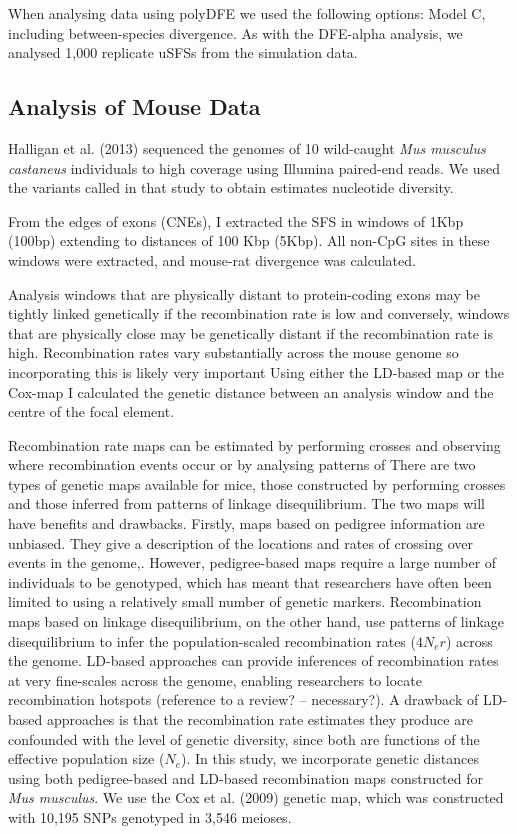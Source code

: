 \documentclass[11pt]{article}
\begin{document}
	 When analysing data using polyDFE we used the following options: Model C, including between-species divergence. As with the DFE-alpha analysis, we analysed 1,000 replicate uSFSs from the simulation data.

	\subsection*{Analysis of Mouse Data}

Halligan et al. (2013) sequenced the genomes of 10 wild-caught \emph{Mus musculus castaneus} individuals to high coverage using Illumina paired-end reads. We used the variants called in that study to obtain estimates nucleotide diversity.

	From the edges of exons (CNEs), I extracted the SFS in windows of 1Kbp (100bp) extending to distances of 100 Kbp (5Kbp). All non-CpG sites in these windows were extracted, and mouse-rat divergence was calculated. 
	
	Analysis windows that are physically distant to protein-coding exons may be tightly linked genetically if the recombination rate is low and conversely, windows that are physically close may be genetically distant if the recombination rate is high. Recombination rates vary substantially across the mouse genome so incorporating this is likely very important 
	Using either the LD-based map or the Cox-map I calculated the genetic distance between an analysis window and the centre of the focal element. 

	Recombination rate maps can be estimated by performing crosses and observing where recombination events occur or by analysing patterns of  
	There are two types of genetic maps available for mice, those constructed by performing crosses and those inferred from patterns of linkage disequilibrium. The two maps will have benefits and drawbacks. Firstly, maps based on pedigree information are unbiased. They give a description of the locations and rates of crossing over events in the genome,. However, pedigree-based maps require a large number of individuals to be genotyped, which has meant that researchers have often been limited to using a relatively small number of genetic markers. Recombination maps based on linkage disequilibrium, on the other hand, use patterns of linkage disequilibrium to infer the population-scaled recombination rates ($4N_er$) across the genome. LD-based approaches can provide inferences of recombination rates at very fine-scales across the genome, enabling researchers to locate recombination hotspots (reference to a review? – necessary?). A drawback of LD-based approaches is that the recombination rate estimates they produce are confounded with the level of genetic diversity, since both are functions of the effective population size ($N_e$). In this study, we incorporate genetic distances using both pedigree-based and LD-based recombination maps constructed for \emph{Mus musculus}. We use the Cox et al. (2009) genetic map, which was constructed with 10,195 SNPs genotyped in 3,546 meioses. 
\end{document}

